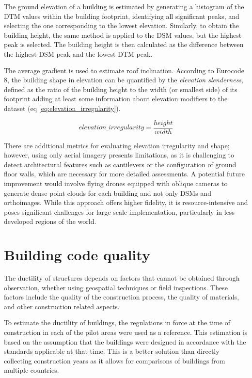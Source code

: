 \begin{refsection}
The ground elevation of a building is estimated by generating a histogram of the DTM values within the building footprint, identifying all significant peaks, and selecting the one corresponding to the lowest elevation. Similarly, to obtain the building height, the same method is applied to the DSM values, but the highest peak is selected. The building height is then calculated as the difference between the highest DSM peak and the lowest DTM peak.


The average gradient is used to estimate roof inclination. According to Eurocode 8, the building shape in elevation can be quantified by the \textit{elevation slenderness}, defined as the ratio of the building height to the width (or smallest side) of its footprint adding at least some information about elevation modifiers to the dataset (eq \ref{eq:elevation_irregularity}).

\begin{equation}
    \label{eq:elevation_irregularity}
    elevation\_irregularity = \frac{height}{width}
\end{equation}

There are additional metrics for evaluating elevation irregularity and shape; however, using only aerial imagery presents limitations, as it is challenging to detect architectural features such as cantilevers or the configuration of ground floor walls, which are necessary for more detailed assessments. A potential future improvement would involve flying drones equipped with oblique cameras to generate dense point clouds for each building and not only DSMs and orthoimages. While this approach offers higher fidelity, it is resource-intensive and poses significant challenges for large-scale implementation, particularly in less developed regions of the world.

\renewcommand{\sectionnametext}{Building code quality}
\renewcommand{\headingtextR}{\thesection. \sectionnametext}
\section{\sectionnametext}

The ductility of structures depends on factors that cannot be obtained through observation, whether using geospatial techniques or field inspections. These factors include the quality of the construction process, the quality of materials, and other construction related aspects.


To estimate the ductility of buildings, the regulations in force at the time of construction in each of the pilot areas were used as a reference. This estimation is based on the assumption that the buildings were designed in accordance with the standards applicable at that time. This is a better solution than directly collecting construction years as it allows for comparisons of buildings from multiple countries. 



\end{refsection}
